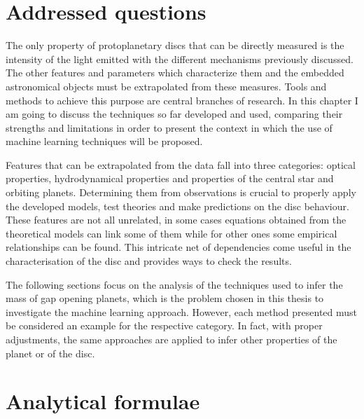 \documentclass[a4paper,10pt]{report}
\begin{document}
\section{Addressed questions}


The only property of protoplanetary discs that can be directly measured
is the intensity of the light emitted with the different mechanisms previously discussed.
The other features and parameters which characterize them and the embedded astronomical objects
must be extrapolated from these measures. 
Tools and methods to achieve this purpose are central branches of research. In this chapter I am going to discuss
the techniques so far developed and used, comparing their strengths and limitations in order to present the context
in which the use of machine learning techniques will be proposed.


Features that can be extrapolated from the data fall into three categories: optical properties, hydrodynamical properties
and properties of the central star and orbiting planets.
Determining them from observations is crucial
to properly apply the developed models, test theories and make predictions on the disc behaviour.
These features are not all unrelated, in some cases equations obtained from the theoretical
models can link some of them while for other ones some empirical relationships can be found.
This intricate net of dependencies come useful in the characterisation of the disc and provides 
ways to check the results.

The following sections focus on the analysis of the
techniques used to infer the mass of gap opening planets, which is
the problem chosen in this thesis to investigate the machine learning approach.
However, each method presented must be considered an example for the respective category. 
In fact, with proper adjustments, the same approaches are
applied to infer other properties of the planet or of the disc.

\section{Analytical formulae}

\end{document}
